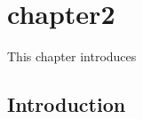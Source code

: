 

\chapter{chapter2}
\label{chapter:2}


\begin{Abstract}
This chapter introduces 
\end{Abstract}

\acresetall 

\section{Introduction}
